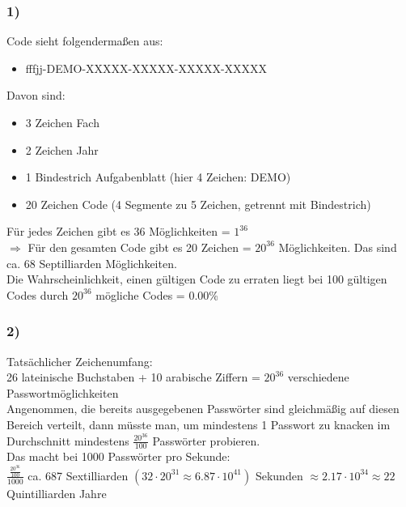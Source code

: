 \documentclass{article}
\begin{document}
\subsubsection*{1)}
Code sieht folgendermaßen aus:
\begin{itemize}
    \item fffjj-DEMO-XXXXX-XXXXX-XXXXX-XXXXX
\end{itemize}
Davon sind:
\begin{itemize}
    \item 3 Zeichen Fach
    \item 2  Zeichen Jahr
    \item 1 Bindestrich Aufgabenblatt (hier 4 Zeichen: DEMO)
    \item 20 Zeichen Code (4 Segmente zu 5 Zeichen, getrennt mit Bindestrich)
\end{itemize}
Für jedes Zeichen gibt es 36 Möglichkeiten = $1^{36}$\\
$\Rightarrow$ Für den gesamten Code gibt es 20 Zeichen = $20^{36}$ Möglichkeiten.
Das sind ca. 68 Septilliarden Möglichkeiten.\\
Die Wahrscheinlichkeit, einen gültigen Code zu erraten liegt bei 100 gültigen Codes durch $20^{36}$ mögliche Codes = $0.00$\%
\subsubsection*{2)}
Tatsächlicher Zeichenumfang:\\
26 lateinische Buchstaben + 10 arabische Ziffern
= $20^{36}$ verschiedene Passwortmöglichkeiten\\
Angenommen, die bereits ausgegebenen Passwörter sind gleichmäßig auf diesen Bereich verteilt, dann müsste man, um mindestens 1 Passwort zu knacken im Durchschnitt mindestens $\frac{20^{36}}{100}$ Passwörter probieren.\\
Das macht bei 1000 Passwörter pro Sekunde:\\
$\frac{\frac{20^{36}}{100}}{1000}$ ca. 687 Sextilliarden $(32\cdot20^{31}\approx6.87\cdot10^{41})$ Sekunden $\approx 2.17\cdot10^{34}\approx22$ Quintilliarden Jahre\\
\vspace{3,5cm}
\end{document}
